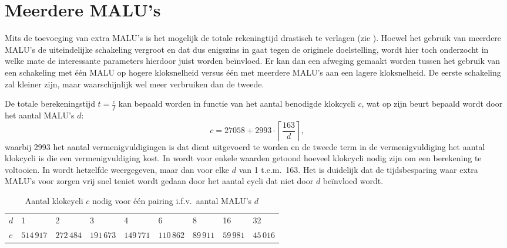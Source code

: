 \section{Meerdere MALU's\label{sectie-resulaten-malus}}

Mits de toevoeging van extra MALU's is het mogelijk de totale rekeningtijd drastisch te verlagen (zie ). Hoewel het gebruik van meerdere MALU's de uiteindelijke schakeling vergroot en dat dus enigszins in gaat tegen de originele doelstelling, wordt hier toch onderzocht in welke mate de interessante parameters hierdoor juist worden be\"invloed. Er kan dan een afweging gemaakt worden tussen het gebruik van een schakeling met \'e\'en MALU op hogere kloksnelheid versus \'e\'en met meerdere MALU's aan een lagere kloksnelheid. De eerste schakeling zal kleiner zijn, maar waarschijnlijk wel meer verbruiken dan de tweede.

De totale berekeningstijd $t = \frac{c}{f}$ kan bepaald worden in functie van het aantal benodigde klokcycli $c$, wat op zijn beurt bepaald wordt door het aantal MALU's $d$:
\[c = 27058 + 2993 \cdot \left\lceil \frac{163}{d} \right\rceil,\]
waarbij 2993 het aantal vermenigvuldigingen is dat dient uitgevoerd te worden en de tweede term in de vermenigvuldiging het aantal klokcycli is die een vermenigvuldiging kost. In  wordt voor enkele waarden getoond hoeveel klokcycli nodig zijn om een berekening te voltooien. In  wordt hetzelfde weergegeven, maar dan voor elke $d$ van 1 t.e.m.\ 163. Het is duidelijk dat de tijdsbesparing waar extra MALU's voor zorgen vrij snel teniet wordt gedaan door het aantal cycli dat niet door $d$ be\"invloed wordt.

\begin{table}[h]
	\caption{Aantal klokcycli $c$ nodig voor \'e\'en pairing i.f.v.\ aantal MALU's $d$}
	\label{tabel-resultaten-multi-cycles}

	\begin{narrow}{-1cm}{-1cm}
		\centering
		\begin{tabular}{lllllllll}
			\toprule
			$d$	& 1	& 2	& 3	& 4	& 6	& 8	& 16	& 32\\
			$c$	& $514\,917$	& $272\,484$	& $191\,673$	& $149\,771$	& $110\,862$	& $89\,911$	& $59\,981$	& $45\,016$\\
			\bottomrule	
		\end{tabular}
	\end{narrow}
\end{table}

